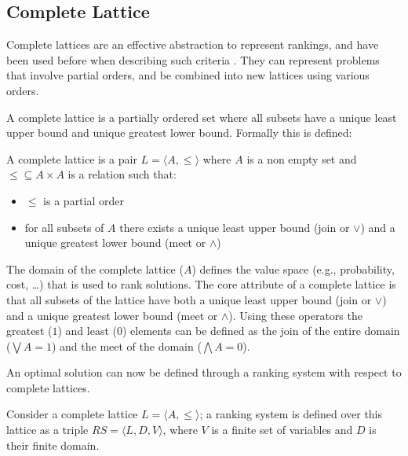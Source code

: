 \subsection{Complete Lattice}
Complete lattices are an effective abstraction to represent rankings,
and have been used before when describing such criteria \cite{Bistarelli1997,Fernandez}.
They can represent problems that involve partial orders, and be combined into new lattices using various orders.

A complete lattice is a partially ordered set where all subsets have a unique least upper bound and unique greatest lower bound.
Formally this is defined:
\begin{defs}
A complete lattice is a pair $L = \langle A, \leq \rangle$ where $A$ is a non empty set 
and $\leq \subseteq A \times A$ is a relation such that:
\begin{itemize}
  \item $\leq$ is a partial order
  \item for all subsets of $A$ there exists a unique least upper bound (join or $\vee$) and a unique greatest lower bound (meet or $\wedge$)
\end{itemize}
\end{defs}

The domain of the complete lattice ($A$) defines the value space (e.g., probability, cost, \ldots) 
that is used to rank solutions. 
The core attribute of a complete lattice is that all subsets of the lattice have both a unique least upper bound (join or $\vee$) 
and a unique greatest lower bound (meet or $\wedge$).
Using these operators the greatest ($1$) and least ($0$) elements can be defined as
the join of the entire domain ($\bigvee A = 1$) and the meet of the domain ($\bigwedge A = 0$).

An optimal solution can now be defined through a ranking system with respect to complete lattices.
\begin{defs}
Consider a complete lattice $L = \langle A, \leq \rangle$; 
a ranking system is defined over this lattice as a triple $RS = \langle L, D, V \rangle$, 
where $V$ is a finite set of variables and $D$ is their finite domain.
\end{defs}

